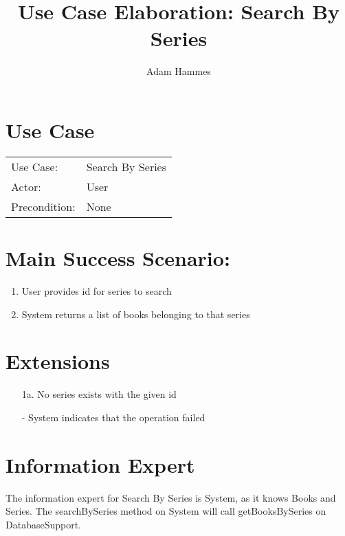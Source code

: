 \documentclass{article}
\title{Use Case Elaboration: Search By Series}
\author{ Adam Hammes }
\begin{document}
\maketitle


\section*{Use Case}
\begin{tabular}{l l}
Use Case:     & Search By Series\\
Actor:        & User \\
Precondition: & None \\
\end{tabular}


\section*{Main Success Scenario:}

\begin{enumerate}
   \item User provides id for series to search
   \item System returns a list of books belonging to that series

\end{enumerate}

\section*{Extensions}

\begin{itemize}
    \item [1a.] No series exists with the given id

    - System indicates that the operation failed
                            
\end{itemize}


\section*{Information Expert}

The information expert for Search By Series is System, as it knows Books and
Series.
The searchBySeries method on System will call getBooksBySeries on DatabaseSupport.
\end{document}

